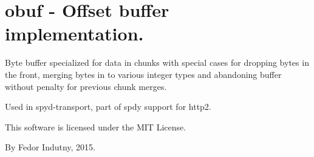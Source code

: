 \chapter{obuf -\/ Offset buffer implementation.}
\hypertarget{md_pkiclassroomrescheduler_2src_2main_2frontend_2node__modules_2obuf_2_r_e_a_d_m_e}{}\label{md_pkiclassroomrescheduler_2src_2main_2frontend_2node__modules_2obuf_2_r_e_a_d_m_e}
\label{md_pkiclassroomrescheduler_2src_2main_2frontend_2node__modules_2obuf_2_r_e_a_d_m_e_autotoc_md17655}%
%
 Byte buffer specialized for data in chunks with special cases for dropping bytes in the front, merging bytes in to various integer types and abandoning buffer without penalty for previous chunk merges.

Used in spyd-\/transport, part of spdy support for http2.

This software is licensed under the MIT License.

By Fedor Indutny, 2015. 